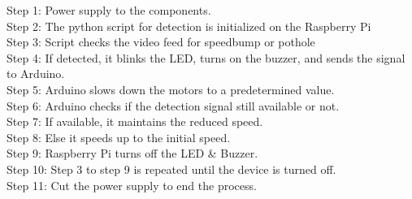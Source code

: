 \noindent
Step 1: Power supply to the components. \\
Step 2: The python script for detection is initialized on the Raspberry Pi \\
Step 3: Script checks the video feed for speedbump or pothole \\
Step 4: If detected, it blinks the LED, turns on the buzzer, and sends the signal to Arduino.\\ 
Step 5: Arduino slows down the motors to a predetermined value. \\
Step 6: Arduino checks if the detection signal still 
available or not. \\
Step 7: If available, it maintains the reduced speed. \\
Step 8: Else it speeds up to the initial speed. \\
Step 9: Raspberry Pi turns off the LED \& Buzzer. \\
Step 10: Step 3 to step 9 is repeated until the device is turned off. \\
Step 11: Cut the power supply to end the process.

